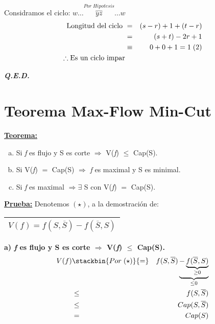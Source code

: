 \documentclass[12pt,a4paper]{report}
\newcommand{\QED}{\hfill \textit{\textbf{Q.E.D.}}}
\begin{document}
\begin{itemize}
\begin{itemize}
						\par Considramos el ciclo: $w \dotsc \overbrace{y z}^{Por \; Hipotesis} \dotsc w$
						\begin{eqnarray}
							\nonumber \textup{Longitud del ciclo } &=& (s - r) + 1 + (t - r) \\
							\nonumber &=& (s + t) - 2r + 1 \\
							\nonumber &\equiv & 0 + 0 + 1 = 1 \; (2) \\
							\nonumber \therefore \textup{Es un ciclo impar}
						\end{eqnarray}
					\end{itemize}
			\end{itemize}

		\QED

	\section{Teorema Max-Flow Min-Cut}
		\textbf{\underline{Teorema:}}
			\begin{enumerate}[a)]
				\item Si \textit{f} es flujo y S es corte $\Rightarrow$ V(\textit{f}) $\leq$ Cap(S).
				\item Si V(\textit{f}) $=$ Cap(S) $\Rightarrow$ \textit{f} es maximal y S es minimal.
				\item Si \textit{f} es maximal $\Rightarrow \exists$ S con V(\textit{f}) $=$ Cap(S).
			\end{enumerate}

		\textbf{\underline{Prueba:}} Denotemos $(\star)$, a la demostración de:
			\begin{center}
				\begin{tabular}{|c|} \hline $V(\textit{f}) = f(S, \overline{S}) - f(\overline{S},S)$ \\\hline \end{tabular}
			\end{center}

			\vspace{5mm}
			\textbf{a) \textit{f} es flujo y S es corte $\Rightarrow$ V(\textit{f}) $\leq$ Cap(S).}
				\begin{eqnarray}
					\nonumber V(f) &\stackbin{Por \; (\star)}{=}& f(S, \overline{S})\underbrace{-\underbrace{f(\overline{S}, S)}_{\geq 0}}_{\leq 0} \\
					\nonumber &\leq & f(S, \overline{S}) \\
					\nonumber &\leq & Cap(S, \overline{S}) \\
					\nonumber &=& Cap(S)
				\end{eqnarray}
\end{document}
